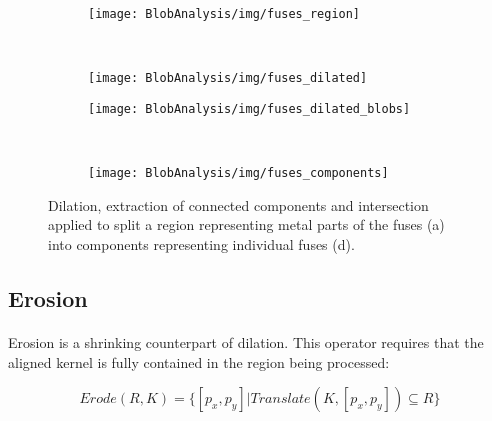 \begin{figure}
    \begin{subfigure}[b]{\basicWidth}
            \centering
            \texttt{[image: BlobAnalysis/img/fuses\_region]}
            \caption{}
    \end{subfigure}%
    ~
    \begin{subfigure}[b]{\basicWidth}
            \centering
            \texttt{[image: BlobAnalysis/img/fuses\_dilated]}
            \caption{}
    \end{subfigure}

    \begin{subfigure}[b]{\basicWidth}
            \centering
            \texttt{[image: BlobAnalysis/img/fuses\_dilated\_blobs]}
            \caption{}
    \end{subfigure}%
    ~
    \begin{subfigure}[b]{\basicWidth}
            \centering
            \texttt{[image: BlobAnalysis/img/fuses\_components]}
            \caption{}
    \end{subfigure}
    
    \caption{Dilation, extraction of connected components and intersection applied to split a region representing metal parts of the fuses (a) into components representing individual fuses (d).}
    \label{fig:DilationAppliedToFuses}
\end{figure}

\subsection{Erosion}

\paragraph*{}
Erosion is a shrinking counterpart of dilation. This operator requires that the aligned kernel is fully contained in the region being processed:

\[
	Erode(R,K) = \{[p_x,p_y] | Translate(K, [p_x,p_y]) \subseteq R \}
\] 

\newarray\erosionInput
{}

\newarray\erosionKernel
{}

